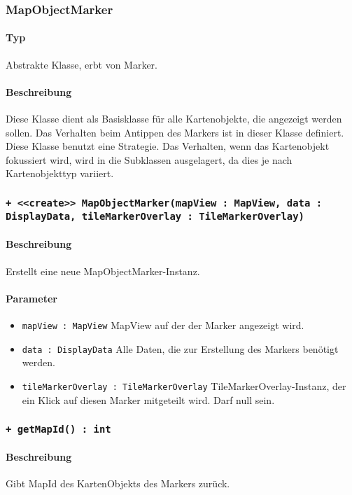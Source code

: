 \subsubsection{MapObjectMarker}
\paragraph*{Typ}
Abstrakte Klasse, erbt von Marker.
\paragraph*{Beschreibung}
Diese Klasse dient als Basisklasse für alle Kartenobjekte, die angezeigt werden sollen.
Das Verhalten beim Antippen des Markers ist in dieser Klasse definiert.
Diese Klasse benutzt eine Strategie. Das Verhalten, wenn das Kartenobjekt fokussiert wird,
wird in die Subklassen ausgelagert, da dies je nach Kartenobjekttyp variiert.

\subsubsection*{\texttt{+ <<create>> MapObjectMarker(mapView : MapView, data : DisplayData, tileMarkerOverlay : TileMarkerOverlay)}}%
\paragraph*{Beschreibung}
Erstellt eine neue MapObjectMarker-Instanz.
\paragraph*{Parameter}
\begin{itemize}
    \item \texttt{mapView : MapView} MapView auf der der Marker angezeigt wird.
    \item \texttt{data : DisplayData} Alle Daten, die zur Erstellung des Markers benötigt werden.
    \item \texttt{tileMarkerOverlay : TileMarkerOverlay} TileMarkerOverlay-Instanz, der ein Klick 
    auf diesen Marker mitgeteilt wird. Darf null sein.
\end{itemize}

\subsubsection*{\texttt{+ getMapId() : int}}%
\paragraph*{Beschreibung}
Gibt MapId des KartenObjekts des Markers zurück.
